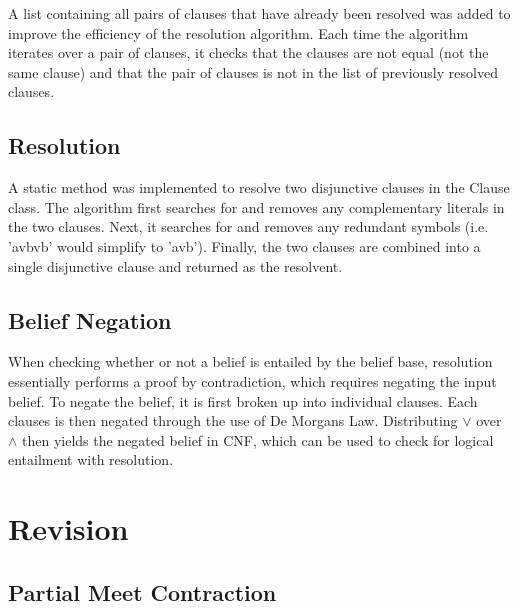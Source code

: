 \documentclass[a4paper,10pt]{article}
\begin{document}
A list containing all pairs of clauses that have already been resolved was added to improve the efficiency of the resolution algorithm. Each time the algorithm
iterates over a pair of clauses, it checks that the clauses are not equal (not the same clause) and that the pair of clauses is not in the list of previously
resolved clauses. \\

\subsection{Resolution}
\label{subsec:resolution}
A static method was implemented to resolve two disjunctive clauses in the Clause class. The algorithm first searches for and removes any complementary literals
in the two clauses. Next, it searches for and removes any redundant symbols (i.e. 'avbvb' would simplify to 'avb'). Finally, the two clauses are combined into
a single disjunctive clause and returned as the resolvent.

\subsection{Belief Negation}
\label{subsec:negation}
When checking whether or not a belief is entailed by the belief base, resolution essentially performs a proof by contradiction, which requires negating the input belief.
To negate the belief, it is first broken up into individual clauses. Each clauses is then negated through the use of De Morgans Law. Distributing $\vee$ over $\wedge$
then yields the negated belief in CNF, which can be used to check for logical entailment with resolution.

\section{Revision}
\label{sec:revision}


\subsection{Partial Meet Contraction}
\label{subsec:contraction}



\end{document}
